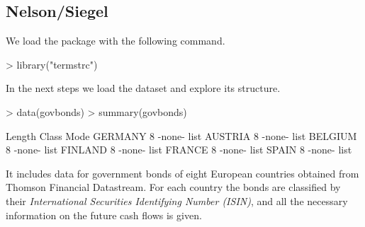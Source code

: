 \subsection{Nelson/Siegel}

We load the package with the following command.


\begin{Schunk}
\begin{Sinput}
> library("termstrc")
\end{Sinput}
\end{Schunk}

In the next steps we load the dataset  and explore its structure.

\begin{Schunk}
\begin{Sinput}
> data(govbonds)
> summary(govbonds)
\end{Sinput}
\begin{Soutput}
        Length Class  Mode
GERMANY 8      -none- list
AUSTRIA 8      -none- list
BELGIUM 8      -none- list
FINLAND 8      -none- list
FRANCE  8      -none- list
SPAIN   8      -none- list
\end{Soutput}
\end{Schunk}

It includes data for government bonds of eight European countries obtained from Thomson Financial Datastream. For each country the bonds are classified by their \emph{International Securities Identifying Number (ISIN)}, and all the necessary information on the future cash flows is given.

\begin{Schunk}
\end{Schunk}

